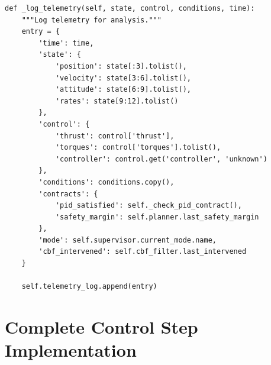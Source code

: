 \begin{lstlisting}[caption={Telemetry logging structure}]
def _log_telemetry(self, state, control, conditions, time):
    """Log telemetry for analysis."""
    entry = {
        'time': time,
        'state': {
            'position': state[:3].tolist(),
            'velocity': state[3:6].tolist(),
            'attitude': state[6:9].tolist(),
            'rates': state[9:12].tolist()
        },
        'control': {
            'thrust': control['thrust'],
            'torques': control['torques'].tolist(),
            'controller': control.get('controller', 'unknown')
        },
        'conditions': conditions.copy(),
        'contracts': {
            'pid_satisfied': self._check_pid_contract(),
            'safety_margin': self.planner.last_safety_margin
        },
        'mode': self.supervisor.current_mode.name,
        'cbf_intervened': self.cbf_filter.last_intervened
    }

    self.telemetry_log.append(entry)
\end{lstlisting}

\section{Complete Control Step Implementation}

